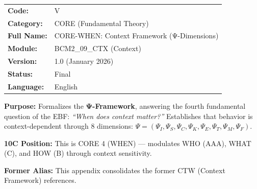 %
%
%
%


\begin{tcolorbox}[colback=gray!5!white, colframe=gray!75!black,
    title=Appendix Header: V CORE-WHEN]

\begin{tabular}{@{}ll@{}}
\textbf{Code:} & V \\
\textbf{Category:} & CORE (Fundamental Theory) \\
\textbf{Full Name:} & CORE-WHEN: Context Framework (Ψ-Dimensions) \\
\textbf{Module:} & BCM2\_09\_CTX (Context) \\
\textbf{Version:} & 1.0 (January 2026) \\
\textbf{Status:} & Final \\
\textbf{Language:} & English \\
\end{tabular}

\vspace{0.5em}
\textbf{Purpose:} Formalizes the \textbf{Ψ-Framework}, answering the
fourth fundamental question of the EBF: \textit{``When does context matter?''}
Establishes that behavior is context-dependent through 8 dimensions:
$\Psi = (\Psi_I, \Psi_S, \Psi_C, \Psi_K, \Psi_E, \Psi_T, \Psi_M, \Psi_F)$.

\textbf{10C Position:} This is CORE 4 (WHEN) --- modulates WHO (AAA), WHAT (C),
and HOW (B) through context sensitivity.

\textbf{Former Alias:} This appendix consolidates the former CTW (Context Framework) references.

\end{tcolorbox}

